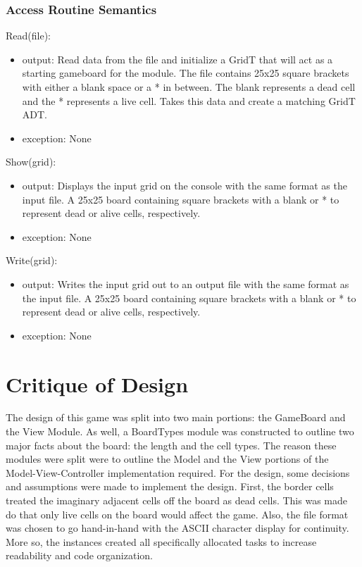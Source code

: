\documentclass[12pt]{article}
\begin{document}
\subsubsection* {Access Routine Semantics}

\noindent Read(file):
\begin{itemize}
\item output:
Read data from the file and initialize a GridT that will act as a starting gameboard for the module. The file contains 25x25 square brackets with either a blank space or a * in between. The blank represents a dead cell and the * represents a live cell. Takes this data and create a matching GridT ADT. 
\item exception: None
\end{itemize}


\noindent Show(grid):
\begin{itemize}
\item output:
Displays the input grid on the console with the same format as the input file. A 25x25 board containing square brackets with a blank or * to represent dead or alive cells, respectively.
\item exception: None 
\end{itemize}

\noindent Write(grid):
\begin{itemize}
\item output:
Writes the input grid out to an output file with the same format as the input file. A 25x25 board containing square brackets with a blank or * to represent dead or alive cells, respectively. 
\item exception: None
\end{itemize}

\newpage

\section* {Critique of Design}

The design of this game was split into two main portions: the GameBoard and the View Module. As well, a BoardTypes module was constructed to outline two major facts about the board: the length and the cell types. The reason these modules were split were to outline the Model and the View portions of the Model-View-Controller implementation required. For the design, some decisions and assumptions were made to implement the design. First, the border cells treated the imaginary adjacent cells off the board as dead cells. This was made do that only live cells on the board would affect the game. Also, the file format was chosen to go hand-in-hand with the ASCII character display for continuity. More so, the instances created all specifically allocated tasks to increase readability and code organization. 
\end{document}
